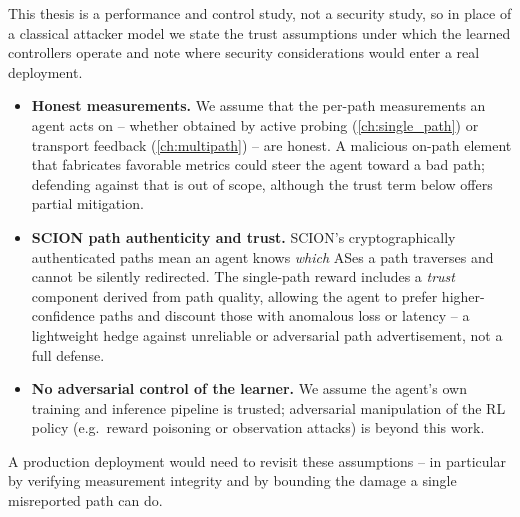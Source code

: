This thesis is a performance and control study, not a security study, so in place of a classical
attacker model we state the trust assumptions under which the learned controllers operate and note
where security considerations would enter a real deployment.

\begin{itemize}
  \item \textbf{Honest measurements.} We assume that the per-path measurements an agent acts on --
  whether obtained by active probing (\cref{ch:single_path}) or transport feedback (\cref{ch:multipath}) --
  are honest. A malicious on-path element that fabricates favorable metrics could steer the agent toward a
  bad path; defending against that is out of scope, although the trust term below offers partial mitigation.
  \item \textbf{SCION path authenticity and trust.} SCION's cryptographically authenticated paths mean
  an agent knows \emph{which} ASes a path traverses and cannot be silently redirected. The single-path
  reward includes a \emph{trust} component derived from path quality, allowing the agent to prefer
  higher-confidence paths and discount those with anomalous loss or latency -- a lightweight hedge against
  unreliable or adversarial path advertisement, not a full defense.
  \item \textbf{No adversarial control of the learner.} We assume the agent's own training and
  inference pipeline is trusted; adversarial manipulation of the RL policy (e.g.\ reward poisoning or
  observation attacks) is beyond this work.
\end{itemize}

A production deployment would need to revisit these assumptions -- in particular by verifying measurement
integrity and by bounding the damage a single misreported path can do.
